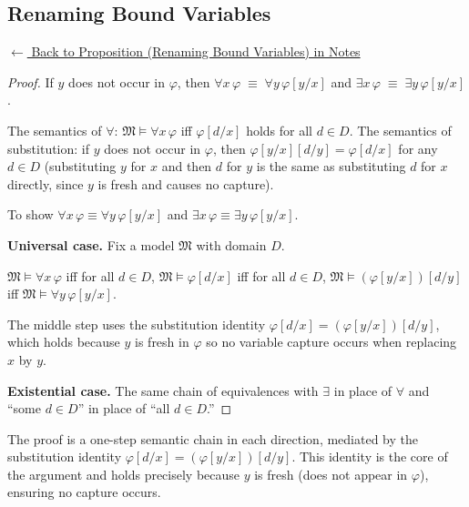 
\subsection*{Renaming Bound Variables}
\label{prf:rename}

\begin{remark*}[Return]
\hyperref[thm:rename]{$\leftarrow$ Back to Proposition (Renaming Bound Variables) in Notes}
\end{remark*}

\begin{proof}
\Claim If $y$ does not occur in $\varphi$, then $\forall x\,\varphi \;\equiv\; \forall y\,\varphi[y/x]$ and $\exists x\,\varphi \;\equiv\; \exists y\,\varphi[y/x]$.

\Given The semantics of $\forall$: $\mathfrak{M} \models \forall x\,\varphi$
iff $\varphi[d/x]$ holds for all $d \in D$. The semantics of substitution: if
$y$ does not occur in $\varphi$, then $\varphi[y/x][d/y] = \varphi[d/x]$ for
any $d \in D$ (substituting $y$ for $x$ and then $d$ for $y$ is the same as
substituting $d$ for $x$ directly, since $y$ is fresh and causes no capture).

\Goal To show $\forall x\,\varphi \equiv \forall y\,\varphi[y/x]$ and
$\exists x\,\varphi \equiv \exists y\,\varphi[y/x]$.

\medskip
\noindent\textbf{Universal case.} Fix a model $\mathfrak{M}$ with domain $D$.

$\mathfrak{M} \models \forall x\,\varphi$
\quad iff \quad
for all $d \in D$, $\mathfrak{M} \models \varphi[d/x]$
\quad iff \quad
for all $d \in D$, $\mathfrak{M} \models (\varphi[y/x])[d/y]$
\quad iff \quad
$\mathfrak{M} \models \forall y\,\varphi[y/x]$.

The middle step uses the substitution identity $\varphi[d/x] = (\varphi[y/x])[d/y]$,
which holds because $y$ is fresh in $\varphi$ so no variable capture occurs when
replacing $x$ by $y$.

\medskip
\noindent\textbf{Existential case.} The same chain of equivalences with
$\exists$ in place of $\forall$ and ``some $d \in D$'' in place of ``all $d
\in D$.'' \AsReq
\end{proof}

\begin{remark*}
The proof is a one-step semantic chain in each direction, mediated by the
substitution identity $\varphi[d/x] = (\varphi[y/x])[d/y]$. This identity is
the core of the argument and holds precisely because $y$ is fresh (does not
appear in $\varphi$), ensuring no capture occurs.
\end{remark*}

